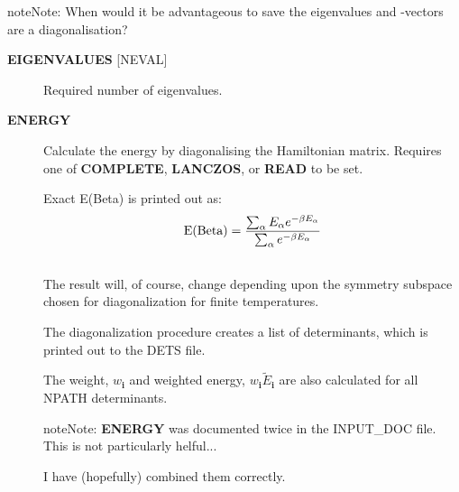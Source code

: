 \documentclass[openany,a4paper,10pt,english]{manual}
\newcommand{\veci}{\ensuremath{\mathbf{i}}}
\begin{document}
\begin{notice}{note}{Note:}
When would it be advantageous to save the eigenvalues and -vectors
are a diagonalisation?
\end{notice}
\begin{description}
\item[\textbf{EIGENVALUES} {[}NEVAL{]}] \leavevmode
Required number of eigenvalues.

\item[\textbf{ENERGY}] \leavevmode
Calculate the energy by diagonalising the Hamiltonian matrix.
Requires one of \textbf{COMPLETE}, \textbf{LANCZOS}, or \textbf{READ} to be set.

Exact E(Beta) is printed out as:
\begin{gather}
\begin{split}\text{E(Beta)} = \frac{ \sum_{\alpha} E_{\alpha} e^{-\beta E_{\alpha}} } { \sum_{\alpha} e^{-\beta E_{\alpha}} }\end{split}\notag\\\begin{split}\end{split}\notag
\end{gather}
The result will, of course, change depending upon the symmetry subspace
chosen for diagonalization for finite temperatures.

The diagonalization procedure creates a list of determinants, which
is printed out to the DETS file.

The weight, $w_{\veci}$ and weighted energy, $w_{\veci}
\tilde{E}_{\veci}$ are also calculated for all NPATH determinants.

\begin{notice}{note}{Note:}
\textbf{ENERGY} was documented twice in the INPUT\_DOC file.  This is not
particularly helful...

I have (hopefully) combined them correctly.
\end{notice}

\end{description}
\end{document}
